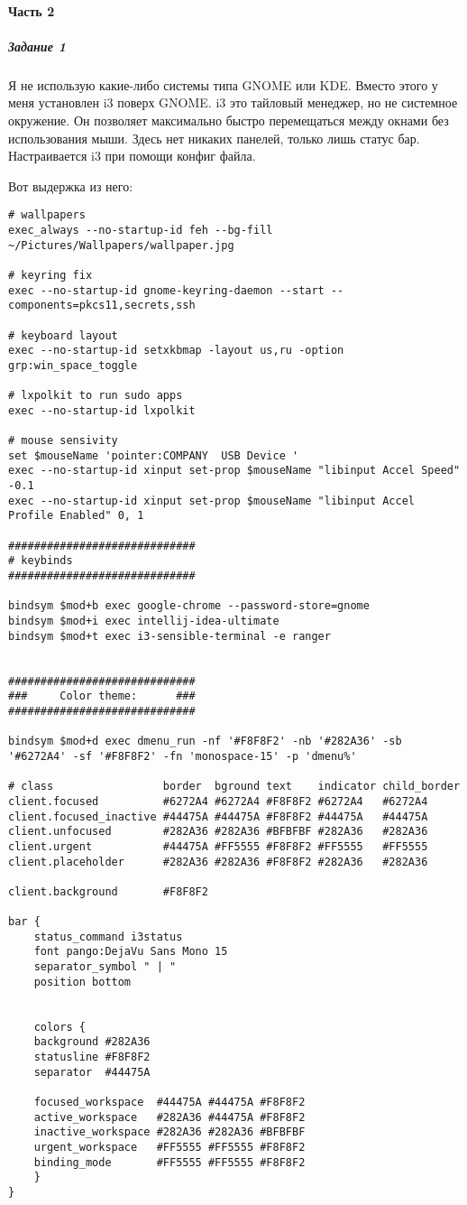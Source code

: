 \paragraph{Часть 2}
\subparagraph{Задание 1}

Я не использую какие-либо системы типа GNOME или KDE.
Вместо этого у меня установлен i3 поверх GNOME.
i3 это тайловый менеджер, но не системное окружение.
Он позволяет максимально быстро перемещаться между окнами без использования мыши.
Здесь нет никаких панелей, только лишь статус бар.
Настраивается i3 при помощи конфиг файла.

Вот выдержка из него:
\begin{Verbatim}[breaklines=true, breakanywhere=true]
# wallpapers
exec_always --no-startup-id feh --bg-fill ~/Pictures/Wallpapers/wallpaper.jpg

# keyring fix
exec --no-startup-id gnome-keyring-daemon --start --components=pkcs11,secrets,ssh 

# keyboard layout
exec --no-startup-id setxkbmap -layout us,ru -option  grp:win_space_toggle

# lxpolkit to run sudo apps
exec --no-startup-id lxpolkit

# mouse sensivity
set $mouseName 'pointer:COMPANY  USB Device '
exec --no-startup-id xinput set-prop $mouseName "libinput Accel Speed" -0.1
exec --no-startup-id xinput set-prop $mouseName "libinput Accel Profile Enabled" 0, 1

#############################
# keybinds
#############################

bindsym $mod+b exec google-chrome --password-store=gnome
bindsym $mod+i exec intellij-idea-ultimate
bindsym $mod+t exec i3-sensible-terminal -e ranger


#############################
###     Color theme:      ###
#############################

bindsym $mod+d exec dmenu_run -nf '#F8F8F2' -nb '#282A36' -sb '#6272A4' -sf '#F8F8F2' -fn 'monospace-15' -p 'dmenu%'

# class                 border  bground text    indicator child_border
client.focused          #6272A4 #6272A4 #F8F8F2 #6272A4   #6272A4
client.focused_inactive #44475A #44475A #F8F8F2 #44475A   #44475A
client.unfocused        #282A36 #282A36 #BFBFBF #282A36   #282A36
client.urgent           #44475A #FF5555 #F8F8F2 #FF5555   #FF5555
client.placeholder      #282A36 #282A36 #F8F8F2 #282A36   #282A36

client.background       #F8F8F2

bar {
    status_command i3status
    font pango:DejaVu Sans Mono 15
    separator_symbol " | "
    position bottom

    
    colors {
    background #282A36
    statusline #F8F8F2
    separator  #44475A

    focused_workspace  #44475A #44475A #F8F8F2
    active_workspace   #282A36 #44475A #F8F8F2
    inactive_workspace #282A36 #282A36 #BFBFBF
    urgent_workspace   #FF5555 #FF5555 #F8F8F2
    binding_mode       #FF5555 #FF5555 #F8F8F2
    }
}
\end{Verbatim}